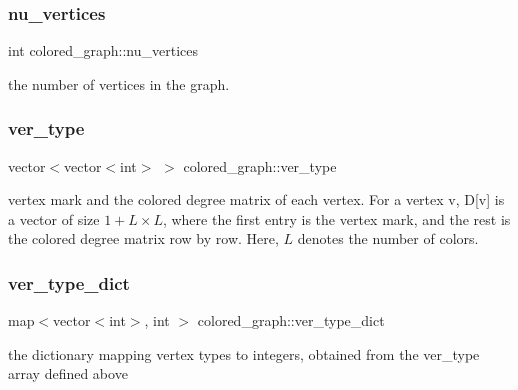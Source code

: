 \subsubsection{\texorpdfstring{nu\+\_\+vertices}{nu\_vertices}}
{\footnotesize\ttfamily int colored\+\_\+graph\+::nu\+\_\+vertices}



the number of vertices in the graph. 

\mbox{\label{classcolored__graph_a2cc32e7146fa3319f83cfa940f5e1be4}} 
\subsubsection{\texorpdfstring{ver\+\_\+type}{ver\_type}}
{\footnotesize\ttfamily vector$<$vector$<$int$>$ $>$ colored\+\_\+graph\+::ver\+\_\+type}



vertex mark and the colored degree matrix of each vertex. For a vertex v, D\mbox{[}v\mbox{]} is a vector of size $1 + L \times L$, where the first entry is the vertex mark, and the rest is the colored degree matrix row by row. Here, $L$ denotes the number of colors. 

\mbox{\label{classcolored__graph_aeb780762429ddac375799f4a45405712}} 
\subsubsection{\texorpdfstring{ver\+\_\+type\+\_\+dict}{ver\_type\_dict}}
{\footnotesize\ttfamily map$<$vector$<$int$>$, int $>$ colored\+\_\+graph\+::ver\+\_\+type\+\_\+dict}



the dictionary mapping vertex types to integers, obtained from the ver\+\_\+type array defined above 

\mbox{\label{classcolored__graph_a491ed2ea1a65118af02ec606c8d44c0a}} 
